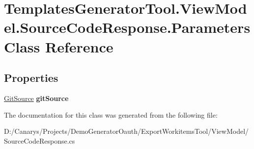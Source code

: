 \hypertarget{class_templates_generator_tool_1_1_view_model_1_1_source_code_response_1_1_parameters}{}\section{Templates\+Generator\+Tool.\+View\+Model.\+Source\+Code\+Response.\+Parameters Class Reference}
\label{class_templates_generator_tool_1_1_view_model_1_1_source_code_response_1_1_parameters}
\subsection*{Properties}
\begin{DoxyCompactItemize}
\item 
\mbox{\label{class_templates_generator_tool_1_1_view_model_1_1_source_code_response_1_1_parameters_a9750bbdbfd562736c964bd5a46b362e2}} 
\mbox{\hyperlink{class_templates_generator_tool_1_1_view_model_1_1_source_code_response_1_1_git_source}{Git\+Source}} {\bfseries git\+Source}
\end{DoxyCompactItemize}


The documentation for this class was generated from the following file\+:\begin{DoxyCompactItemize}
\item 
D\+:/\+Canarys/\+Projects/\+Demo\+Generator\+Oauth/\+Export\+Workitems\+Tool/\+View\+Model/Source\+Code\+Response.\+cs\end{DoxyCompactItemize}
